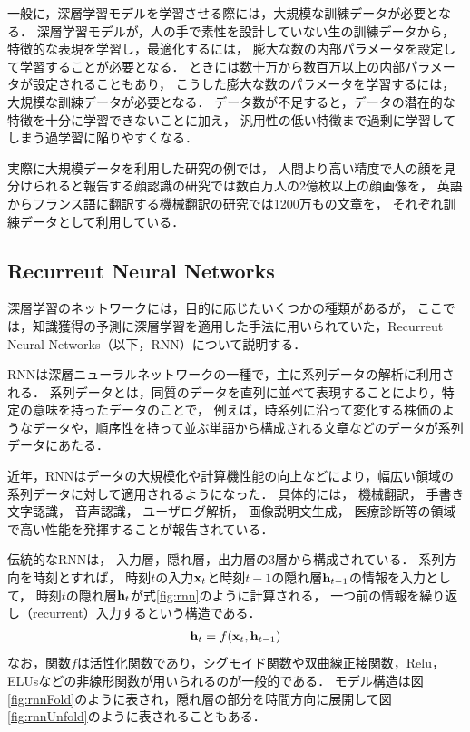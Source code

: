 一般に，深層学習モデルを学習させる際には，大規模な訓練データが必要となる．
深層学習モデルが，人の手で素性を設計していない生の訓練データから，特徴的な表現を学習し，最適化するには，
膨大な数の内部パラメータを設定して学習することが必要となる．
ときには数十万から数百万以上の内部パラメータが設定されることもあり，
こうした膨大な数のパラメータを学習するには，大規模な訓練データが必要となる．
データ数が不足すると，データの潜在的な特徴を十分に学習できないことに加え，
汎用性の低い特徴まで過剰に学習してしまう過学習に陥りやすくなる\cite{tetko1995neural}．

実際に大規模データを利用した研究の例では，
人間より高い精度で人の顔を見分けられると報告する顔認識の研究\cite{schroff2015facenet}では数百万人の2億枚以上の顔画像を，
英語からフランス語に翻訳する機械翻訳の研究\cite{xu2015show}では1200万もの文章を，
それぞれ訓練データとして利用している．



\subsection{Recurreut Neural Networks}
深層学習のネットワークには，目的に応じたいくつかの種類があるが，
ここでは，知識獲得の予測に深層学習を適用した手法\cite{piech2015deep}に用いられていた，Recurreut Neural Networks\cite{williams1989learning}（以下，RNN）について説明する．


RNNは深層ニューラルネットワークの一種で，主に系列データの解析に利用される．
系列データとは，同質のデータを直列に並べて表現することにより，特定の意味を持ったデータのことで，
例えば，時系列に沿って変化する株価のようなデータや，順序性を持って並ぶ単語から構成される文章などのデータが系列データにあたる．

近年，RNNはデータの大規模化や計算機性能の向上などにより，幅広い領域の系列データに対して適用されるようになった．
具体的には，
機械翻訳\cite{sutskever2014sequence, dong2015multi}，
手書き文字認識\cite{graves2009offline,louradour2014curriculum}，
音声認識\cite{hinton2012deep,bahdanau2015end}，
ユーザログ解析\cite{hidasi2015session}，
画像説明文生成\cite{xu2015show,vinyals2014show}，
医療診断\cite{choi2015doctor,lipton2015learning}等の領域で高い性能を発揮することが報告されている．

伝統的なRNNは，
入力層，隠れ層，出力層の3層から構成されている．
系列方向を時刻とすれば，
時刻$t$の入力${\bf x}_t$と時刻$t-1$の隠れ層${\bf h}_{t-1}$の情報を入力として，
時刻$t$の隠れ層${\bf h}_t$が式\ref{fig:rnn}のように計算される，
一つ前の情報を繰り返し（recurrent）入力するという構造である．
\begin{eqnarray}
\label{fig:rnn}
{\bf h}_t = f({\bf x}_t, {\bf h}_{t-1})
\end{eqnarray}
なお，関数$f$は活性化関数であり，シグモイド関数や双曲線正接関数，Relu\cite{nair2010rectified}，ELUs\cite{clevert2015fast}などの非線形関数が用いられるのが一般的である．
モデル構造は図\ref{fig:rnnFold}のように表され，隠れ層の部分を時間方向に展開して図\ref{fig:rnnUnfold}のように表されることもある．

